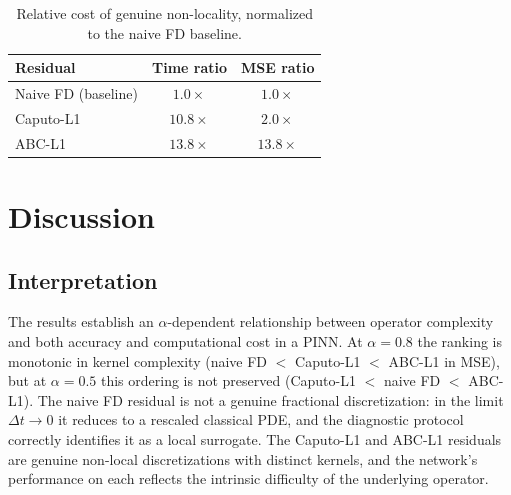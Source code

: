 \documentclass[11pt]{article}
\begin{document}
\begin{table}[h]
\centering
\caption{Relative cost of genuine non-locality, normalized to the naive FD baseline.}
\label{tab:cost}
\begin{tabular}{lcc}
\toprule
Residual & Time ratio & MSE ratio \\
\midrule
Naive FD (baseline) & \(1.0\times\) & \(1.0\times\) \\
Caputo-L1           & \(10.8\times\) & \(2.0\times\) \\
ABC-L1              & \(13.8\times\) & \(13.8\times\) \\
\bottomrule
\end{tabular}
\end{table}

\section{Discussion}
\label{sec:discussion}

\subsection{Interpretation}

The results establish an \(\alpha\)-dependent relationship between
operator complexity and both accuracy and computational cost in a PINN.
At \(\alpha=0.8\) the ranking is monotonic in kernel complexity
(naive FD \(<\) Caputo-L1 \(<\) ABC-L1 in MSE), but at \(\alpha=0.5\) this
ordering is not preserved (Caputo-L1 \(<\) naive FD \(<\) ABC-L1). The naive FD residual is not a genuine fractional discretization: in the limit \(\Delta t\to 0\) it reduces to a rescaled classical PDE, and the diagnostic protocol correctly identifies it as a local surrogate. The Caputo-L1 and ABC-L1 residuals are genuine non-local discretizations with distinct kernels, and the network's performance on each reflects the intrinsic difficulty of the underlying operator.
\end{document}
